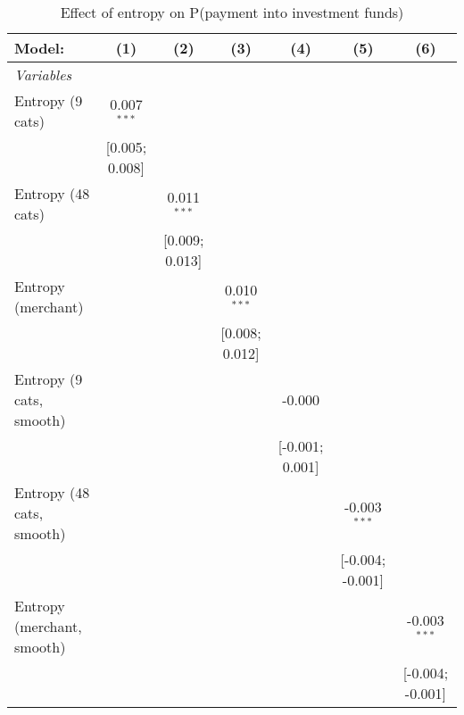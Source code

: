 
\begin{table}[htbp]
   \centering
   \tiny
   \begin{threeparttable}[b]
      \caption{\label{tab:reg_has_investments_main} Effect of entropy on P(payment into investment funds)}
      \begin{tabular}{lcccccc}
         \tabularnewline \midrule \midrule
         Model:                     & (1)            & (2)            & (3)            & (4)             & (5)              & (6)\\  
         \midrule
         \emph{Variables}\\
         Entropy (9 cats)           & 0.007$^{***}$  &                &                &                 &                  &   \\   
                                    & [0.005; 0.008] &                &                &                 &                  &   \\   
         Entropy (48 cats)          &                & 0.011$^{***}$  &                &                 &                  &   \\   
                                    &                & [0.009; 0.013] &                &                 &                  &   \\   
         Entropy (merchant)         &                &                & 0.010$^{***}$  &                 &                  &   \\   
                                    &                &                & [0.008; 0.012] &                 &                  &   \\   
         Entropy (9 cats, smooth)   &                &                &                & -0.000          &                  &   \\   
                                    &                &                &                & [-0.001; 0.001] &                  &   \\   
         Entropy (48 cats, smooth)  &                &                &                &                 & -0.003$^{***}$   &   \\   
                                    &                &                &                &                 & [-0.004; -0.001] &   \\   
         Entropy (merchant, smooth) &                &                &                &                 &                  & -0.003$^{***}$\\   
                                    &                &                &                &                 &                  & [-0.004; -0.001]\\   

\end{tabular}
\end{threeparttable}
\end{table}
